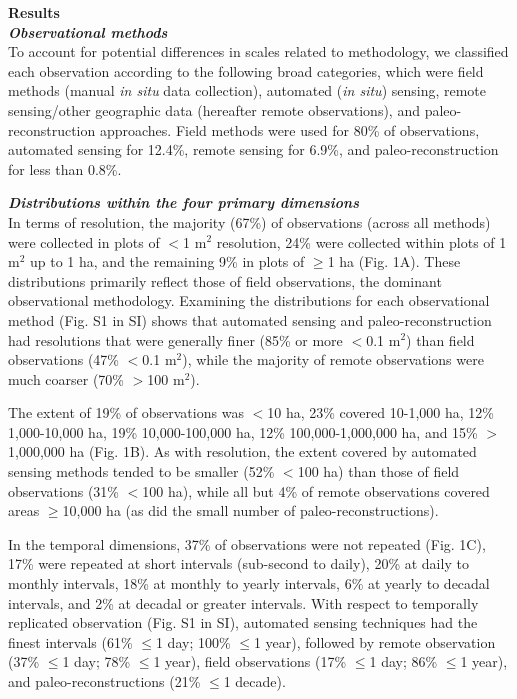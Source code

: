 \documentclass[12pt]{article}
\begin{document}
\noindent \textbf{Results}\\
\noindent \textbf{\emph{Observational methods}}\\
To account for potential differences in scales related to methodology, we classified each observation according to the following broad categories, which were field methods (manual \emph{in situ} data collection), automated (\emph{in situ}) sensing, remote sensing/other geographic data (hereafter remote observations), and paleo-reconstruction approaches. Field methods were used for 80\% of observations, automated sensing for 12.4\%, remote sensing for 6.9\%, and paleo-reconstruction for less than 0.8\%. 

\noindent \textbf{\emph{Distributions within the four primary dimensions}}\\
In terms of resolution, the majority (67\%) of observations (across all methods) were collected in plots of $<$1 m$^2$ resolution, 24\% were collected within plots of 1 m$^2$ up to 1 ha, and the remaining 9\% in plots of $\geq$1 ha (Fig. 1A). These distributions primarily reflect those of field observations, the dominant observational methodology. Examining the distributions for each observational method (Fig. S1 in SI) shows that automated sensing and paleo-reconstruction had resolutions that were generally finer (85\% or more $<$0.1 m$^2$) than field observations (47\% $<$0.1 m$^2$), while the majority of remote observations were much coarser (70\% $>$100 m$^2$).   

The extent of 19\% of observations was $<$10 ha, 23\% covered 10-1,000 ha, 12\% 1,000-10,000 ha, 19\% 10,000-100,000 ha, 12\% 100,000-1,000,000 ha, and 15\% $>$1,000,000 ha (Fig. 1B).  As with resolution, the extent covered by automated sensing methods tended to be smaller (52\% $<$100 ha) than those of field observations (31\% $<$100 ha), while all but 4\% of remote observations covered areas $\geq$10,000 ha (as did the small number of paleo-reconstructions).  


In the temporal dimensions, 37\% of observations were not repeated (Fig. 1C), 17\% were repeated at short intervals (sub-second to daily), 20\% at daily to monthly intervals, 18\% at monthly to yearly intervals, 6\% at yearly to decadal intervals, and 2\% at decadal or greater intervals. With respect to temporally replicated observation (Fig. S1 in SI), automated sensing techniques had the finest intervals (61\% $\leq$1 day; 100\% $\leq$1 year), followed by remote observation (37\% $\leq$1 day; 78\% $\leq$1 year), field observations (17\% $\leq$1 day; 86\% $\leq$1 year), and paleo-reconstructions (21\% $\leq$1 decade).   
\end{document}
